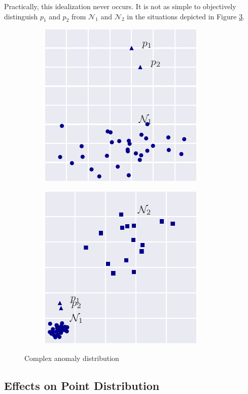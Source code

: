 Practically, this idealization never occurs. It is not as simple to objectively distinguish $p_1$ and $p_2$ from $\mathcal{N}_1$ and $\mathcal{N}_2$ in the situations depicted in Figure \ref{fig:hard_dist}.

\begin{figure}[H]
  \centering
  \begin{subfigure}[H]{2in}
    \includegraphics{figs/hard1_dist.pdf}
    \caption{}
    \label{fig:hard1_dist}
  \end{subfigure}
  \begin{subfigure}[H]{2in}
    \includegraphics{figs/hard2_dist.pdf}
    \caption{}
    \label{fig:hard2_dist}
  \end{subfigure}
  \caption{Complex anomaly distribution}
  \label{fig:hard_dist}
\end{figure}


\subsection{Effects on Point Distribution}

